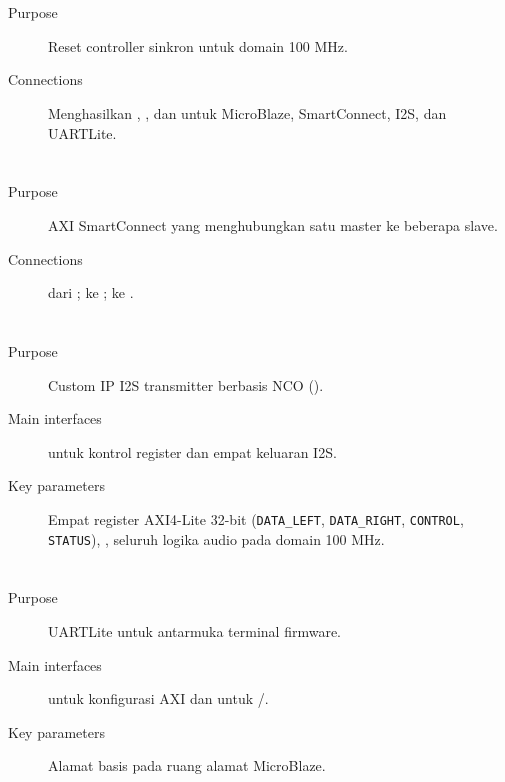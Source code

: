 \section*{}
\begin{description}
    \item[Purpose] Reset controller sinkron untuk domain 100 MHz.
    \item[Connections] Menghasilkan , , dan  untuk MicroBlaze, SmartConnect, I2S, dan UARTLite.
\end{description}

\section*{}
\begin{description}
    \item[Purpose] AXI SmartConnect yang menghubungkan satu master ke beberapa slave.
    \item[Connections]  dari ;  ke ;  ke .
\end{description}

\section*{}
\begin{description}
    \item[Purpose] Custom IP I2S transmitter berbasis NCO ().
    \item[Main interfaces]  untuk kontrol register dan empat keluaran I2S.
    \item[Key parameters] Empat register AXI4-Lite 32-bit (\texttt{DATA\_LEFT}, \texttt{DATA\_RIGHT}, \texttt{CONTROL}, \texttt{STATUS}), , seluruh logika audio pada domain 100 MHz.
\end{description}

\section*{}
\begin{description}
    \item[Purpose] UARTLite untuk antarmuka terminal firmware.
    \item[Main interfaces]  untuk konfigurasi AXI dan  untuk /.
    \item[Key parameters] Alamat basis  pada ruang alamat MicroBlaze.
\end{description}
